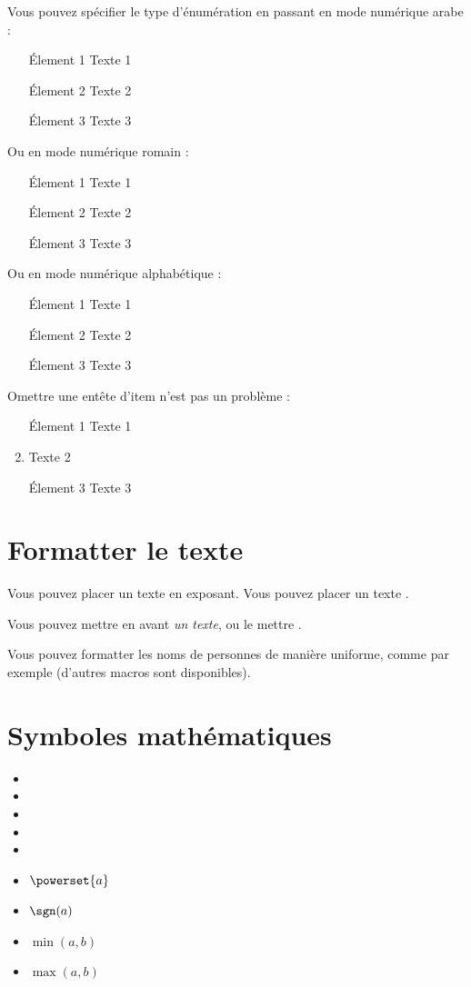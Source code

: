 \documentclass[french]{spimumlpphdthesis}
\begin{document}
Vous pouvez spécifier le type d'énumération en passant en mode numérique arabe :
\begin{enumerate}[1]
\item[\'Element 1] Texte 1
\item[\'Element 2] Texte 2
\item[\'Element 3] Texte 3
\end{enumerate}

Ou en mode numérique romain :
\begin{enumerate}[i]
\item[\'Element 1] Texte 1
\item[\'Element 2] Texte 2
\item[\'Element 3] Texte 3
\end{enumerate}

Ou en mode numérique alphabétique :
\begin{enumerate}[a]
\item[\'Element 1] Texte 1
\item[\'Element 2] Texte 2
\item[\'Element 3] Texte 3
\end{enumerate}

Omettre une entête d'item n'est pas un problème :
\begin{enumerate}
\item[\'Element 1] Texte 1
\item Texte 2
\item[\'Element 3] Texte 3
\end{enumerate}

\section{Formatter le texte}

Vous pouvez placer un texte \textup{en exposant}. Vous pouvez placer un texte .

Vous pouvez mettre en avant \emph{un texte}, ou le mettre .

Vous pouvez formatter les noms de personnes de manière uniforme, comme par exemple  (d'autres macros sont disponibles).

\section{Symboles mathématiques}

\begin{itemize}
\item \R
\item \N
\item \Z
\item \Q
\item \C
\item $\powerset{a}$
\item $\sgn(a)$
\item $\min(a, b)$
\item $\max(a, b)$
\end{itemize}
\end{document}
